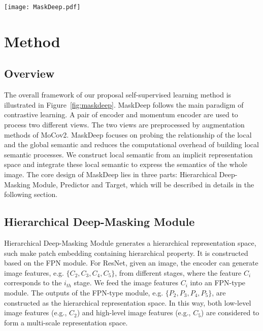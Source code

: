 \documentclass[10pt,twocolumn,letterpaper]{article}
\begin{document}

\begin{figure*}[t]
     \centering
    \texttt{[image: MaskDeep.pdf]}
     \caption{The framework of MaskDeep. MaskDeep uses sparse patch features from the hierarchical representation space to align the global semantics of the whole image. After feeding one view of image into the encoder, we generate the hierarchical representation space through the Hierarchical Deep-Masking module. We sample multi-group patches from the representation space. Then, each group of patches is decoded by a simple linear predictor. The global semantics of the whole image is generated by a momentum encoder from the other view of the image.}
     \label{fig:maskdeep}
\end{figure*}


\section{Method}
\label{sec:Framework}

\subsection{Overview}

The overall framework of our proposal self-supervised learning method is illustrated in Figure~\ref{fig:maskdeep}. MaskDeep follows the main paradigm of contrastive learning. A pair of encoder and momentum encoder are used to process two different views. The two views are preprocessed by augmentation methods of MoCov2\cite{chen2020improved}. MaskDeep focuses on probing the relationship of the local and the global semantic and reduces the computational overhead of building local semantic processes. We construct local semantic from an implicit representation space and integrate these local semantic to express the semantics of the whole image. The core design of MaskDeep lies in three parts: Hierarchical Deep-Masking Module, Predictor and Target, which will be described in details in the following section. 

\subsection{Hierarchical Deep-Masking Module}

Hierarchical Deep-Masking Module generates a hierarchical representation space, such make patch embedding containing hierarchical property. It is constructed based on the FPN module\cite{lin2017feature}. For ResNet, given an image, the encoder can generate image features, e.g. $\{C_2, C_3, C_4, C_5\}$, from different stages, where the feature $C_i$ corresponds to the $i_{th}$ stage. We feed the image features  $C_i$ into an FPN-type module. The outputs of the FPN-type module, e.g. $\{P_2, P_3, P_4, P_5\}$, are constructed as the hierarchical representation space. In this way, both low-level image features (e.g., $C_2$) and high-level image features (e.g., $C_5$) are considered to form a multi-scale representation space.  
\end{document}
